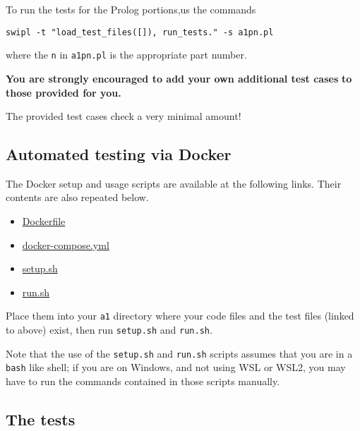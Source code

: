 \documentclass[11pt]{article}
\begin{document}
To run the tests for the Prolog portions,us the commands
\begin{verbatim}
swipl -t "load_test_files([]), run_tests." -s a1pn.pl
\end{verbatim}
where the \texttt{n} in \texttt{a1pn.pl} is the appropriate part number.

\begin{center}
\textbf{You are strongly encouraged to add your own additional test cases}
\textbf{to those provided for you.}

The provided test cases check a very minimal amount!
\end{center}

\subsection*{Automated testing via Docker}
\label{sec:orgb035c75}
The Docker setup and usage scripts are available at the following links.
Their contents are also repeated below.
\begin{itemize}
\item \href{./testing/a1/Dockerfile}{Dockerfile}
\item \href{./testing/a1/docker-compose.yml}{docker-compose.yml}
\item \href{./testing/a1/setup.sh}{setup.sh}
\item \href{./testing/a1/run.sh}{run.sh}
\end{itemize}
Place them into your \texttt{a1} directory where your code files
and the test files (linked to above) exist,
then run \texttt{setup.sh} and \texttt{run.sh}.

Note that the use of the \texttt{setup.sh} and \texttt{run.sh} scripts assumes
that you are in a \texttt{bash} like shell; if you are on Windows,
and not using WSL or WSL2, you may have
to run the commands contained in those scripts manually.

\subsection*{The tests}
\label{sec:org866c2e2}
\end{document}
